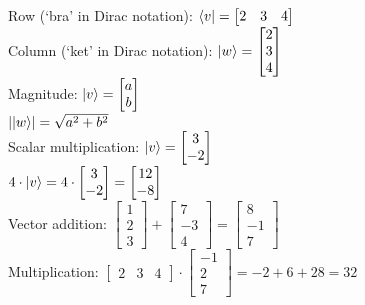 \begin{example}
  Row (`bra' in Dirac notation): $\langle v\rvert = \begin{bmatrix}
    2 & 3 & 4
  \end{bmatrix}$\\
  Column (`ket' in Dirac notation): $\lvert w\rangle = 
  \begin{bmatrix}
    2\\
    3\\
    4
  \end{bmatrix}
  $\\
  Magnitude: $\lvert v\rangle = 
  \begin{bmatrix}
    a\\
    b\\
  \end{bmatrix}$\\
  $\lvert\lvert w\rangle\rvert = \sqrt{a^2 + b^2}$\\
  Scalar multiplication: $\lvert v\rangle = 
  \begin{bmatrix}
    3\\
    -2
  \end{bmatrix}$\\
  $4 \cdot \lvert v\rangle = 4 \cdot
  \begin{bmatrix}
    3\\
    -2
  \end{bmatrix} = \begin{bmatrix}
    12\\
    -8
  \end{bmatrix}$\\
  Vector addition: $\begin{bmatrix}
    1\\
    2\\
    3
  \end{bmatrix} + \begin{bmatrix}
    7\\
    -3\\
    4
  \end{bmatrix} = \begin{bmatrix}
    8\\
    -1\\
    7
  \end{bmatrix}$\\
  Multiplication: $\begin{bmatrix}
    2 & 3 & 4
  \end{bmatrix} \cdot \begin{bmatrix}
    -1\\
    2\\
    7
  \end{bmatrix} = -2 + 6 + 28 = 32$\\
\end{example}

